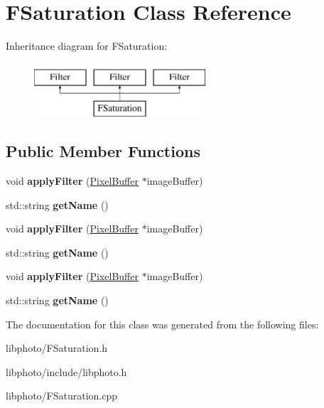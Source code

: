 \hypertarget{classFSaturation}{\section{F\-Saturation Class Reference}
\label{classFSaturation}
}
Inheritance diagram for F\-Saturation\-:\begin{figure}[H]
\begin{center}
\leavevmode
\includegraphics[height=2.000000cm]{classFSaturation}
\end{center}
\end{figure}
\subsection*{Public Member Functions}
\begin{DoxyCompactItemize}
\item 
\hypertarget{classFSaturation_a9e35fd05500411807bfcbe36b8f24a55}{void {\bfseries apply\-Filter} (\hyperlink{classPixelBuffer}{Pixel\-Buffer} $\ast$image\-Buffer)}\label{classFSaturation_a9e35fd05500411807bfcbe36b8f24a55}

\item 
\hypertarget{classFSaturation_a55d272a3a50fcb65d94a66821b7b0c73}{std\-::string {\bfseries get\-Name} ()}\label{classFSaturation_a55d272a3a50fcb65d94a66821b7b0c73}

\item 
\hypertarget{classFSaturation_a9e35fd05500411807bfcbe36b8f24a55}{void {\bfseries apply\-Filter} (\hyperlink{classPixelBuffer}{Pixel\-Buffer} $\ast$image\-Buffer)}\label{classFSaturation_a9e35fd05500411807bfcbe36b8f24a55}

\item 
\hypertarget{classFSaturation_a55d272a3a50fcb65d94a66821b7b0c73}{std\-::string {\bfseries get\-Name} ()}\label{classFSaturation_a55d272a3a50fcb65d94a66821b7b0c73}

\item 
\hypertarget{classFSaturation_a9e35fd05500411807bfcbe36b8f24a55}{void {\bfseries apply\-Filter} (\hyperlink{classPixelBuffer}{Pixel\-Buffer} $\ast$image\-Buffer)}\label{classFSaturation_a9e35fd05500411807bfcbe36b8f24a55}

\item 
\hypertarget{classFSaturation_a55d272a3a50fcb65d94a66821b7b0c73}{std\-::string {\bfseries get\-Name} ()}\label{classFSaturation_a55d272a3a50fcb65d94a66821b7b0c73}

\end{DoxyCompactItemize}


The documentation for this class was generated from the following files\-:\begin{DoxyCompactItemize}
\item 
libphoto/F\-Saturation.\-h\item 
libphoto/include/libphoto.\-h\item 
libphoto/F\-Saturation.\-cpp\end{DoxyCompactItemize}
